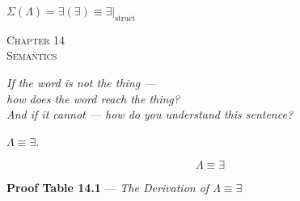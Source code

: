 \documentclass[10pt, openany, oneside]{book}
\renewcommand{\large}{\fontsize{11.5}{14}\selectfont}
\renewcommand{\huge}{\fontsize{17}{21}\selectfont}
\begin{document}
\vspace{0.5em}

\begin{center}
    $\Sigma(\Lambda) = \exists(\exists) \equiv \exists|_{\text{struct}}$
\end{center}


%
%
%

\newpage

\begin{center}
    {\huge\scshape Chapter 14}\\[0.3em]
    {\large\scshape Semantics}
\end{center}

\vspace{1.5em}

\begin{center}
    \itshape
    If the word is not the thing ---\\
    how does the word reach the thing?\\
    And if it cannot --- how do you understand this sentence?
\end{center}

\vspace{2em}


\noindent $\Lambda \equiv \exists$.

$$\boxed{\Lambda \equiv \exists}$$

\vspace{0.5em}

\textbf{Proof Table 14.1} --- \textit{The Derivation of $\Lambda \equiv \exists$}

\vspace{0.5em}
\end{document}
